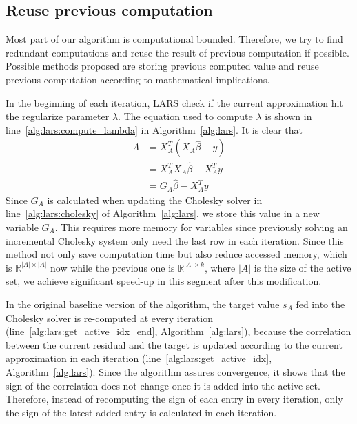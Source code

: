 \subsection{Reuse previous computation}
Most part of our algorithm is computational bounded. Therefore, we try to find redundant computations and reuse the result of previous computation if possible.
Possible methods proposed are storing previous computed value and reuse previous computation according to mathematical implications.

In the beginning of each iteration, LARS check if the current approximation hit the regularize parameter $\lambda$. The equation used to compute $\lambda$ is shown in line~\ref{alg:lars:compute_lambda} in Algorithm~\ref{alg:lars}.
It is clear that 
\begin{equation}
    \begin{split}
        \Lambda &= X_A^T ( X_A \hat{\beta} - y) \\
                &= X_A^T X_A \hat{\beta} - X_A^T y \\
                &= G_A \hat{\beta} - X_A^T y
    \end{split}
\end{equation}
Since $G_A$ is calculated when updating the Cholesky solver in line~\ref{alg:lars:cholesky} of Algorithm~\ref{alg:lars}, we store this value in a new variable $G_A$. This requires more memory for variables since previously solving an incremental Cholesky system only need the last row in each iteration.
Since this method not only save computation time but also reduce accessed memory, which is $\mathbb{R}^{|A| \times |A|}$ now while the previous one is $\mathbb{R}^{|A| \times k}$, where $|A|$ is the size of the active set, we achieve significant speed-up in this segment after this modification.

In the original baseline version of the algorithm, the target value $s_A$ fed into the Cholesky solver is re-computed at every iteration (line~\ref{alg:lars:get_active_idx_end}, Algorithm~\ref{alg:lars}), because the correlation between the current residual and the target is updated according to the current approximation in each iteration (line~\ref{alg:lars:get_active_idx}, Algorithm~\ref{alg:lars}).
Since the algorithm assures convergence, it shows that the sign of the correlation does not change once it is added into the active set.
Therefore, instead of recomputing the sign of each entry in every iteration, only the sign of the latest added entry is calculated in each iteration.

